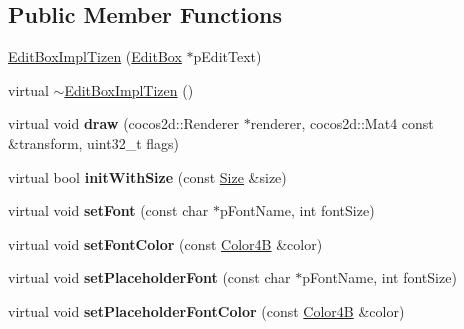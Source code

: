 \subsection*{Public Member Functions}
\begin{DoxyCompactItemize}
\item 
\hyperlink{classui_1_1EditBoxImplTizen_a4ec99ac2f65e3138baf2098c2713b111}{Edit\+Box\+Impl\+Tizen} (\hyperlink{classui_1_1EditBox}{Edit\+Box} $\ast$p\+Edit\+Text)
\item 
virtual \hyperlink{classui_1_1EditBoxImplTizen_a269e7f369e6b526d034b10ff6dd8df53}{$\sim$\+Edit\+Box\+Impl\+Tizen} ()
\item 
\mbox{\label{classui_1_1EditBoxImplTizen_a5e212e9858372427d3cdcc1511c5c99d}} 
virtual void {\bfseries draw} (cocos2d\+::\+Renderer $\ast$renderer, cocos2d\+::\+Mat4 const \&transform, uint32\+\_\+t flags)
\item 
\mbox{\label{classui_1_1EditBoxImplTizen_aff413f43356a3d3f6ee4d69a73b6179a}} 
virtual bool {\bfseries init\+With\+Size} (const \hyperlink{classSize}{Size} \&size)
\item 
\mbox{\label{classui_1_1EditBoxImplTizen_aae575dbb1921e5e93ddf6d86381ea256}} 
virtual void {\bfseries set\+Font} (const char $\ast$p\+Font\+Name, int font\+Size)
\item 
\mbox{\label{classui_1_1EditBoxImplTizen_a15b6237e64259bc4d0844fb72bb35531}} 
virtual void {\bfseries set\+Font\+Color} (const \hyperlink{structColor4B}{Color4B} \&color)
\item 
\mbox{\label{classui_1_1EditBoxImplTizen_afc8aac1cc6dca7c8a1f8dfb5127a743d}} 
virtual void {\bfseries set\+Placeholder\+Font} (const char $\ast$p\+Font\+Name, int font\+Size)
\item 
\mbox{\label{classui_1_1EditBoxImplTizen_aedcda558c0525589bb3edbfa929fdaf8}} 
virtual void {\bfseries set\+Placeholder\+Font\+Color} (const \hyperlink{structColor4B}{Color4B} \&color)
\item 
\mbox{\label{classui_1_1EditBoxImplTizen_ab60c6a61d0770895de11739a82d29096}} 

\end{DoxyCompactItemize}
